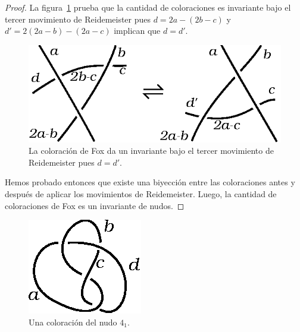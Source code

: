 \documentclass[graybox]{svmult}
\begin{document}
\begin{theorem}
\begin{proof}
		La figura~\ref{fig:coloringR3} prueba que la cantidad de
		coloraciones es invariante bajo el tercer movimiento de Reidemeister
		pues $d=2a-(2b-c)$ y $d'=2(2a-b)-(2a-c)$ implican que $d=d'$.
		\begin{figure}[ht]
			\centering
				\includegraphics[scale=0.6]{images/coloringR3}
				\caption{La coloración de Fox da un invariante bajo el tercer movimiento
				de Reidemeister pues $d=d'$.}
				\label{fig:coloringR3}
		\end{figure}
		
        Hemos probado entonces que existe una biyección entre las coloraciones
        antes y después de aplicar los movimientos de Reidemeister. Luego, la
        cantidad de coloraciones de Fox es un invariante de nudos.
    \end{proof}
\end{theorem}

\begin{figure}[ht]
	\centering
	\includegraphics[scale=0.7]{images/labels4_1}
	\caption{Una coloración del nudo $4_1$.}
	\label{fig:labels4_1}
\end{figure}
\end{document}
